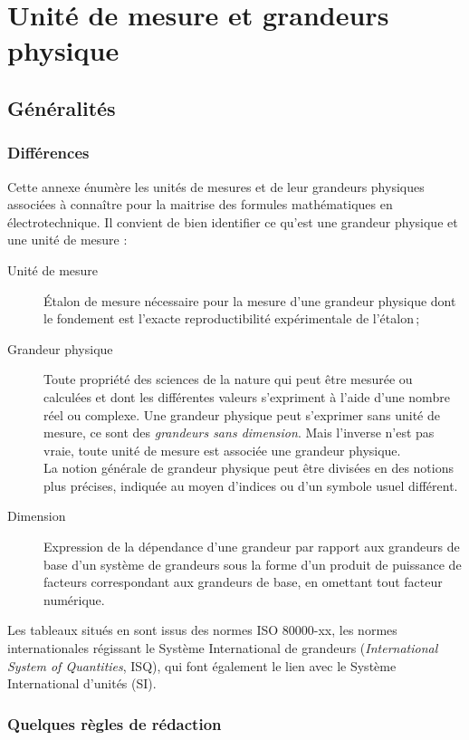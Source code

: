 \documentclass[a4paper, 11pt, twoside, fleqn]{memoir}
\begin{document}


\chapter{Unité de mesure et grandeurs physique}

\section{Généralités}

\subsection{Différences}

Cette annexe énumère les unités de mesures et de leur grandeurs physiques associées à connaître pour la maitrise des formules mathématiques en électrotechnique. Il convient de bien identifier ce qu'est une grandeur physique et une unité de mesure :
\begin{description}
\item[Unité de mesure] \'Etalon de mesure nécessaire pour la mesure d'une grandeur physique dont le fondement est l'exacte reproductibilité expérimentale de l'étalon\,;
\item[Grandeur physique] Toute propriété des sciences de la nature qui peut être mesurée ou calculées et dont les différentes valeurs s'expriment à l'aide d'une nombre réel ou complexe. Une grandeur physique peut s'exprimer sans unité de mesure, ce sont des \emph{grandeurs sans dimension}. Mais l'inverse n'est pas vraie, toute unité de mesure est associée une grandeur physique.\\
La notion générale de grandeur physique peut être divisées en des notions plus précises, indiquée au moyen d'indices ou d'un symbole usuel différent.
\item[Dimension] Expression de la dépendance d'une grandeur par rapport aux grandeurs de base d'un système de grandeurs sous la forme d'un produit de puissance de facteurs correspondant aux grandeurs de base, en omettant tout facteur numérique.
\end{description}
Les tableaux situés en  sont issus des normes ISO 80000-xx\supercite{ISO:80000-2013}, les normes internationales régissant le Système International de grandeurs (\emph{International System of Quantities}, ISQ), qui font également le lien avec le Système International d'unités (SI).

\subsection{Quelques règles de rédaction}
\end{document}
